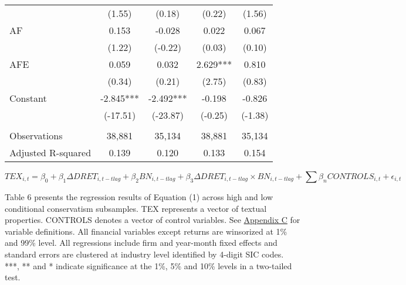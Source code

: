 \begin{table}[H]
\begin{center}
\begin{tabular}{lcccc}
			& (1.55) & (0.18) & (0.22) & (1.56) \\
			AF & 0.153 & -0.028 & 0.022 & 0.067 \\
			& (1.22) & (-0.22) & (0.03) & (0.10) \\
			AFE & 0.059 & 0.032 & 2.629*** & 0.810 \\
			& (0.34) & (0.21) & (2.75) & (0.83) \\
			Constant & -2.845*** & -2.492*** & -0.198 & -0.826 \\
			& (-17.51) & (-23.87) & (-0.25) & (-1.38) \\
			&   &   &   &  \\
			Observations & 38,881 & 35,134 & 38,881 & 35,134 \\
			Adjusted R-squared & 0.139 & 0.120 & 0.133 & 0.154 \\
			\bottomrule
			\bottomrule
		\end{tabular}%
	\end{center}
		\begin{footnotesize}
			\setcounter{equation}{0}
			\begin{equation}
				TEX_{i,t}=\beta_0+\beta_1\Delta DRET_{i,t-tlag}+\beta_2BN_{i,t-tlag}+\beta_3\Delta DRET_{i,t-tlag}\times 		BN_{i,t-tlag}+\sum\beta_nCONTROLS_{i,t}+\epsilon_{i,t}
			\end{equation}
			
			\noindent Table 6 presents the regression results of Equation (1) across high and low conditional conservatism subsamples. TEX represents a vector of textual properties. CONTROLS denotes a vector of control variables. See \hyperref[appc]{Appendix C} for variable definitions. All financial variables except returns are winsorized at 1\% and 99\% level. All regressions include firm and year-month fixed effects and standard errors are clustered at industry level identified by 4-digit SIC codes. ***, ** and * indicate significance at the 1\%, 5\% and 10\% levels in a two-tailed test.
		\end{footnotesize}
\end{table}%